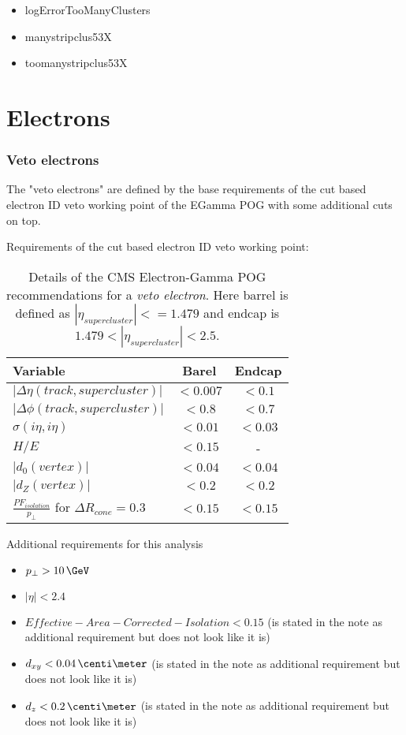 \begin{itemize}
  \item logErrorTooManyClusters
  \item manystripclus53X
  \item toomanystripclus53X
\end{itemize}

\section{Electrons}

\subsubsection{Veto electrons}

The "veto electrons" are defined by the base requirements of the cut based electron ID veto working point of the EGamma POG with some additional cuts on top. 
  
Requirements of the cut based electron ID veto working point:
 
\begin{table}[htp]
  
\begin{tabular}{|l|c|c|}
\hline
Variable & Barel & Endcap \\
\hline\hline
$| \Delta\eta(track,supercluster) |$ & $<0.007$ & $<0.1$  \\
$| \Delta\phi(track,supercluster) |$ & $<0.8  $ & $<0.7$  \\
$ \sigma(i\eta,i\eta)$               & $<0.01 $ & $<0.03$ \\
$H/E$                                & $<0.15 $ &       - \\
$|d_{0}(vertex)|$                    & $<0.04 $ & $<0.04$ \\
$|d_{Z}(vertex)|$                    & $<0.2  $ & $<0.2 $ \\
$\frac{PF_{isolation}}{p_{\perp}}$ for $ \Delta R_{cone}=0.3$  & $<0.15 $ & $<0.15$ \\
\hline
\end{tabular}
\caption{Details of the \gls{CMS} Electron-Gamma \gls{POG} recommendations for a \textit{veto electron}. Here barrel is defined as $ |\eta_{supercluster}|<=1.479 $ and endcap is $ 1.479 < |\eta_{supercluster}| < 2.5 $.} 
\end{table}

 
 
Additional requirements for this analysis
\begin{itemize}
  \item $ p_{\perp} > 10\,\GeV$
  \item $ |\eta| < 2.4 $
  \item $ Effective-Area-Corrected-Isolation < 0.15 $ (is stated in the note as additional requirement but does not look like it is)
  \item $d_{xy}<0.04\,\centi\meter$ (is stated in the note as additional requirement but does not look like it is)
  \item $d_{z} < 0.2\,\centi\meter$ (is stated in the note as additional requirement but does not look like it is)
\end{itemize}
 

